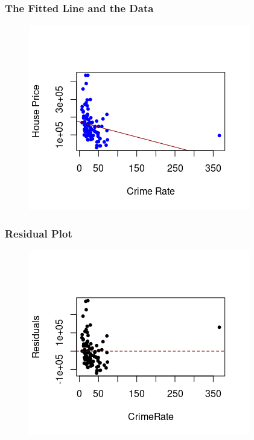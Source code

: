 \documentclass[compress]{beamer}
\begin{document}
\begin{frame}
\frametitle{\sc The Fitted Line and the Data}
	\begin{figure}[!ht]
		\centering
		\includegraphics[scale=0.9]{figs8/scatter-all-reg.png}
	\end{figure}
\end{frame}

\begin{frame}
\frametitle{\sc Residual Plot}
    \begin{figure}[!ht]
		\centering
		\includegraphics[scale=0.9]{figs8/residual.png}
	\end{figure}
\end{frame}

\end{document}
